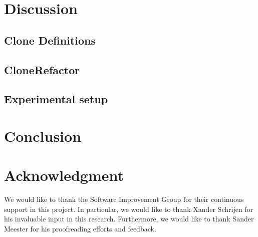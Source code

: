 \documentclass[sigconf,review]{acmart}
\begin{document}
\section{Discussion}
\subsection{Clone Definitions}

\subsection{CloneRefactor}

\subsection{Experimental setup}

\section{Conclusion}

\section*{Acknowledgment}
We would like to thank the Software Improvement Group for their continuous support in this project. In particular, we would like to thank Xander Schrijen for his invaluable input in this research. Furthermore, we would like to thank Sander Meester for his proofreading efforts and feedback.



\end{document}
